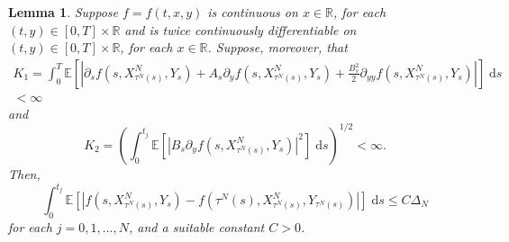 \documentclass[reqno,12pt]{amsart}
\theoremstyle{plain}%
\newtheorem{lem}{Lemma}[section]
\theoremstyle{definition}
\begin{document}
\begin{lem}
    \label{lemestimatesforI1andI2}
    Suppose $f=f(t, x, y)$ is continuous on $x\in \mathbb{R}$, for each $(t, y)\in [0, T]\times \mathbb{R}$ and is twice continuously differentiable on $(t, y)\in [0, T]\times \mathbb{R}$, for each $x\in \mathbb{R}$. Suppose, moreover, that
    \begin{multline}
        \label{estimateforI1}
        K_1 = \int_0^{T}
        \mathbb{E}\left[\left|\partial_s f(s, X_{\tau^N(s)}^N, Y_s) + A_s \partial_y f(s, X_{\tau^N(s)}^N, Y_s) + \frac{B_s^2}{2}\partial_{yy}f(s, X_{\tau^N(s)}^N, Y_s) \right|\right] \;\mathrm{d}s \\
        < \infty
    \end{multline}
    and
    \begin{equation}
        \label{estimateforI2}
        K_2 = \left(\int_0^{t_j} \mathbb{E}\left[\left|B_s \partial_y f(s, X_{\tau^N(s)}^N, Y_s)\right|^2\right] \;\mathrm{d}s\right)^{1/2} < \infty.
    \end{equation}
    Then,
    \begin{equation}
        \label{rewrittennoisetermbound}
        \int_0^{t_j} \mathbb{E}\left[\left| f(s, X_{\tau^N(s)}^N, Y_s) - f(\tau^N(s), X_{\tau^N(s)}^N, Y_{\tau^N(s)}) \right|\right]\;\mathrm{d}s \leq C\Delta_N
    \end{equation}
    for each $j = 0, 1, \ldots, N$, and a suitable constant $C>0$.
\end{lem}
\end{document}

